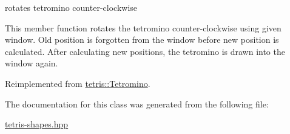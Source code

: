 rotates tetromino counter-\/clockwise 

This member function rotates the tetromino counter-\/clockwise using given window. Old position is forgotten from the window before new position is calculated. After calculating new positions, the tetromino is drawn into the window again. 

Reimplemented from \hyperlink{classtetris_1_1Tetromino_a948dca1ff8a7e128270cdbbba8d214a3}{tetris\+::\+Tetromino}.



The documentation for this class was generated from the following file\+:\begin{DoxyCompactItemize}
\item 
\hyperlink{tetris-shapes_8hpp}{tetris-\/shapes.\+hpp}\end{DoxyCompactItemize}
